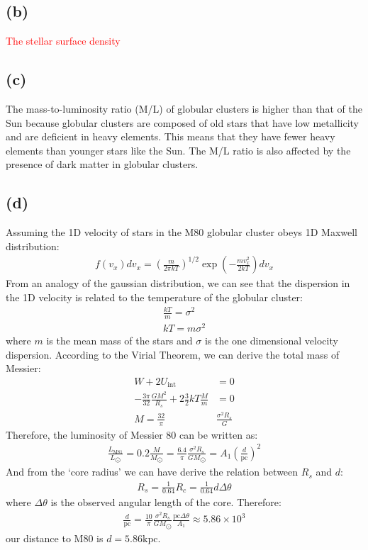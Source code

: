 \documentclass[a4paper,12pt]{article}
\begin{document}
\subsection*{(b)}
\textcolor{red}{The stellar surface density}

\subsection*{(c)}
The mass-to-luminosity ratio (M/L) of globular clusters is higher than that of the Sun 
because globular clusters are composed of old stars that have low metallicity and are deficient in heavy elements. 
This means that they have fewer heavy elements than younger stars like the Sun. 
The M/L ratio is also affected by the presence of dark matter in globular clusters.

\subsection*{(d)}
Assuming the 1D velocity of stars in the M80 globular cluster obeys 1D Maxwell distribution:
\begin{align*}
    f(v_x)dv_x = (\frac{m}{2\pi kT})^{1/2} \exp(-\frac{m v_x^2}{2kT}) d v_x
\end{align*}
From an analogy of the gaussian distribution, we can see that the dispersion in the 1D velocity 
is related to the temperature of the globular cluster:
\begin{align*}
    \frac{kT}{m} = \sigma^2 \\
    kT = m \sigma^2
\end{align*}
where $m$ is the mean mass of the stars and $\sigma$ is the one dimensional velocity dispersion.
According to the Virial Theorem, we can derive the total mass of Messier:
\begin{align*}
    W + 2 U_{\text{int}} &= 0\\
    -\frac{3\pi}{32} \frac{GM^2}{R_s} + 2 \frac{3}{2} kT \frac{M}{m} &= 0 \\
    M = \frac{32}{\pi} & \frac{\sigma^2 R_s}{G}
\end{align*}
Therefore, the luminosity of Messier 80 can be written as:
\begin{align*}
    \frac{L_{\text{M81}}}{L_{\bigodot}} = 0.2 \frac{M}{M_{\bigodot}} = \frac{6.4}{\pi} \frac{\sigma^2 R_s}{G M_{\bigodot}} =  A_1 (\frac{d}{\text{pc}})^2
\end{align*}
And from the `core radius' we can have derive the relation between $R_s$ and $d$:
\begin{align*}
    R_s = \frac{1}{0.64} R_c = \frac{1}{0.64} d \Delta \theta
\end{align*}
where $\Delta \theta$ is the observed angular length of the core. Therefore:
\begin{align*}
    \frac{d}{\text{pc}} = \frac{10}{\pi} \frac{\sigma^2 R_s}{G M_{\bigodot}} \frac{\text{pc} \Delta \theta}{A_1} \approx 5.86 \times 10^3
\end{align*}
our distance to M80 is $d = 5.86 \text{kpc}$.
\end{document}
